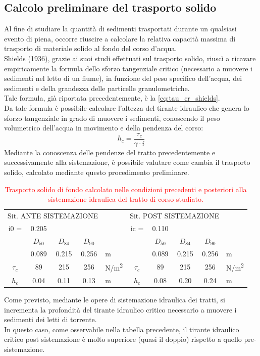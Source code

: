 \subsection{Calcolo preliminare del trasporto solido}
Al fine di studiare la quantità di sedimenti trasportati durante un qualsiasi evento di piena, occorre riuscire a calcolare la relativa capacità massima di trasporto di materiale solido al fondo del corso d'acqua.\\
Shields (1936), grazie ai suoi studi effettuati sul trasporto solido, riuscì a ricavare empiricamente la formula dello sforzo tangenziale critico (necessario a muovere i sedimenti nel letto di un fiume), in funzione del peso specifico dell'acqua, dei sedimenti e della grandezza delle particelle granulometriche.\\
Tale formula, già riportata precedentemente, è la \eqref{eq:tau_cr_shields}.\\
Da tale formula è possibile calcolare l'altezza del tirante idraulico che genera lo sforzo tangenziale in grado di muovere i sedimenti, conoscendo il peso volumetrico dell'acqua in movimento e della pendenza del corso:
\begin{equation}
    h_c = \frac{\tau_c}{\gamma \cdot i} 
\end{equation}
Mediante la conoscenza delle pendenze del tratto precedentemente e successivamente alla sistemazione, è possibile valutare come cambia il trasporto solido, calcolato mediante questo procedimento preliminare.\\

\begin{table}[H] \centering
    \caption{\textcolor{red}{Trasporto solido di fondo calcolato nelle condizioni precedenti e posteriori alla sistemazione idraulica del tratto di corso studiato.}}
    \begin{tabular}{cccclccccl}
    \toprule
    \multicolumn{4}{c}{Sit. ANTE SISTEMAZIONE} & & \multicolumn{4}{c}{Sit. POST SISTEMAZIONE} &      \\
    i0 = & 0.205 & & & &ic = & 0.110 & & &      \\
    \midrule
    & $D_{50}$ & $D_{84}$ & $D_{90}$ & & & $D_{50}$ & $D_{84}$ & $D_{90}$ & \\
    \midrule
    & 0.089 & 0.215 & 0.256 & m & & 0.089 & 0.215 & 0.256  & m  \\
    $\tau_c$ & 89 & 215 & 256 & \unit{N/m^2} & $\tau_c$ & 89 & 215 & 256 & \unit{N/m^2}\\
    $h_c$ & 0.04 & 0.11 & 0.13 & m & $h_c$ & 0.08 & 0.20 & 0.24 & m  \\
    \bottomrule
    \end{tabular}
    \end{table}
Come previsto, mediante le opere di sistemazione idraulica dei tratti, si incrementa la profondità del tirante idraulico critico necessario a muovere i sedimenti dei letti di torrente.\\
In questo caso, come osservabile nella tabella precedente, il tirante idraulico critico post sistemazione è molto superiore (quasi il doppio) rispetto a quello pre-sistemazione.


